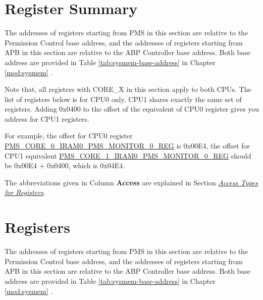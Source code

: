 \documentclass[main\_\_EN.tex]{subfiles}
\begin{document}
\begin{landscape}
\hypertarget{permctrl-reg-summ}{}
\section{Register Summary}
\label{sec:permctrl-reg-summ}

The addresses of registers starting from PMS in this section are relative to the Permission Control base address, and the addresses of registers starting from APB in this section are relative to the ABP Controller base address. Both base address are provided in Table \ref{tab:sysmem-base-address} in Chapter \ref{mod:sysmem} \textit{}.

Note that, all registers with CORE\_X in this section apply to both CPUs. The list of registers below is for CPU0 only. CPU1 shares exactly the same set of registers. Adding 0x{}0400 to the offset of the equivalent of CPU0 register gives you address for CPU1 registers.

For example, the offset for CPU0 register \hyperref[regdesc:PMSCORE0IRAM0PMSMONITOR0REG]{PMS\_CORE\_0\_IRAM0\_PMS\_MONITOR\_0\_REG} is 0x{}00E4, the offset for CPU1 equivalent \hyperref[regdesc:PMSCORE0IRAM0PMSMONITOR0REG]{PMS\_CORE\_1\_IRAM0\_PMS\_MONITOR\_0\_REG} should be 0x{}00E4 + 0x{}0400, which is 0x{}04E4.

The abbreviations given in Column \textbf{Access} are explained in Section \hyperref[glossary-access-types]{\textit{Access Types for Registers}}.







\clearpage
\section{Registers}

The addresses of registers starting from PMS in this section are relative to the Permission Control base address, and the addresses of registers starting from APB in this section are relative to the ABP Controller base address. Both base address are provided in Table \ref{tab:sysmem-base-address} in Chapter \ref{mod:sysmem} \textit{}.




\end{landscape}
\end{document}
